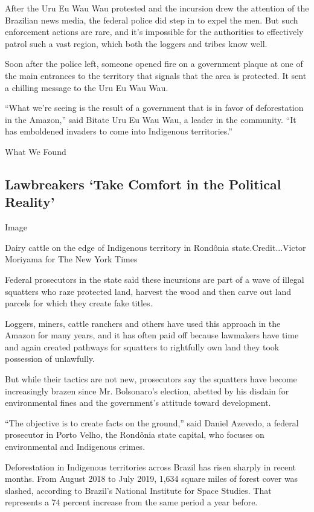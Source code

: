 After the Uru Eu Wau Wau protested and the incursion drew the attention
of the Brazilian news media, the federal police did step in to expel the
men. But such enforcement actions are rare, and it's impossible for the
authorities to effectively patrol such a vast region, which both the
loggers and tribes know well.

Soon after the police left, someone opened fire on a government plaque
at one of the main entrances to the territory that signals that the area
is protected. It sent a chilling message to the Uru Eu Wau Wau.

``What we're seeing is the result of a government that is in favor of
deforestation in the Amazon,'' said Bitate Uru Eu Wau Wau, a leader in
the community. ``It has emboldened invaders to come into Indigenous
territories.''

What We Found

\hypertarget{lawbreakers-take-comfort-in-the-political-reality}{%
\subsection{Lawbreakers `Take Comfort in the Political
Reality'}\label{lawbreakers-take-comfort-in-the-political-reality}}

Image

Dairy cattle on the edge of Indigenous territory in Rondônia
state.Credit...Victor Moriyama for The New York Times

Federal prosecutors in the state said these incursions are part of a
wave of illegal squatters who raze protected land, harvest the wood and
then carve out land parcels for which they create fake titles.

Loggers, miners, cattle ranchers and others have used this approach in
the Amazon for many years, and it has often paid off because lawmakers
have time and again created pathways for squatters to rightfully own
land they took possession of unlawfully.

But while their tactics are not new, prosecutors say the squatters have
become increasingly brazen since Mr. Bolsonaro's election, abetted by
his disdain for environmental fines and the government's attitude toward
development.

``The objective is to create facts on the ground,'' said Daniel Azevedo,
a federal prosecutor in Porto Velho, the Rondônia state capital, who
focuses on environmental and Indigenous crimes.

Deforestation in Indigenous territories across Brazil has risen sharply
in recent months. From August 2018 to July 2019, 1,634 square miles of
forest cover was slashed, according to Brazil's National Institute for
Space Studies. That represents a 74 percent increase from the same
period a year before.

